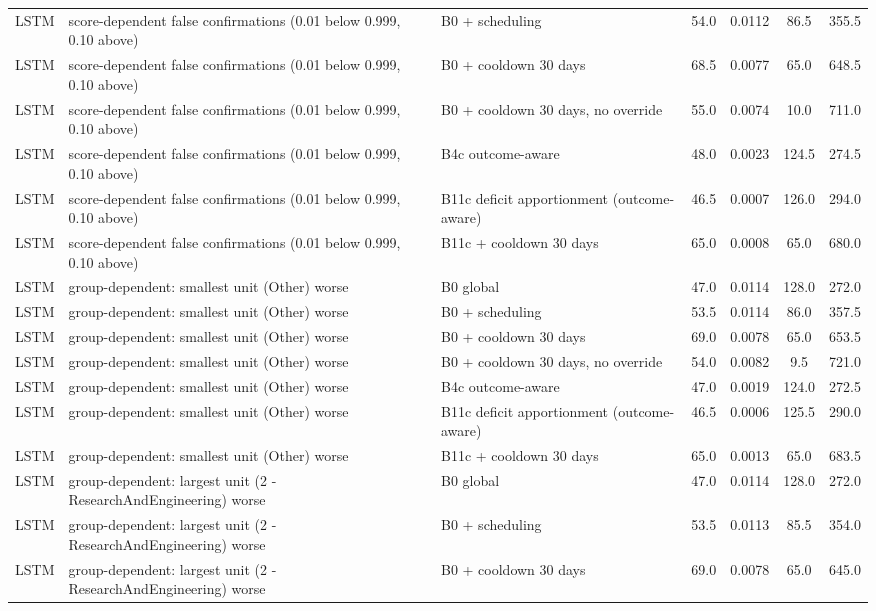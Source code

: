\begin{longtable}{lp{5.2cm}p{4.4cm}cccc}
LSTM & score-dependent false confirmations (0.01 below 0.999, 0.10 above) & B0 + scheduling & 54.0 & 0.0112 & 86.5 & 355.5 \\
LSTM & score-dependent false confirmations (0.01 below 0.999, 0.10 above) & B0 + cooldown 30 days & 68.5 & 0.0077 & 65.0 & 648.5 \\
LSTM & score-dependent false confirmations (0.01 below 0.999, 0.10 above) & B0 + cooldown 30 days, no override & 55.0 & 0.0074 & 10.0 & 711.0 \\
LSTM & score-dependent false confirmations (0.01 below 0.999, 0.10 above) & B4c outcome-aware & 48.0 & 0.0023 & 124.5 & 274.5 \\
LSTM & score-dependent false confirmations (0.01 below 0.999, 0.10 above) & B11c deficit apportionment (outcome-aware) & 46.5 & 0.0007 & 126.0 & 294.0 \\
LSTM & score-dependent false confirmations (0.01 below 0.999, 0.10 above) & B11c + cooldown 30 days & 65.0 & 0.0008 & 65.0 & 680.0 \\
LSTM & group-dependent: smallest unit (Other) worse & B0 global & 47.0 & 0.0114 & 128.0 & 272.0 \\
LSTM & group-dependent: smallest unit (Other) worse & B0 + scheduling & 53.5 & 0.0114 & 86.0 & 357.5 \\
LSTM & group-dependent: smallest unit (Other) worse & B0 + cooldown 30 days & 69.0 & 0.0078 & 65.0 & 653.5 \\
LSTM & group-dependent: smallest unit (Other) worse & B0 + cooldown 30 days, no override & 54.0 & 0.0082 & 9.5 & 721.0 \\
LSTM & group-dependent: smallest unit (Other) worse & B4c outcome-aware & 47.0 & 0.0019 & 124.0 & 272.5 \\
LSTM & group-dependent: smallest unit (Other) worse & B11c deficit apportionment (outcome-aware) & 46.5 & 0.0006 & 125.5 & 290.0 \\
LSTM & group-dependent: smallest unit (Other) worse & B11c + cooldown 30 days & 65.0 & 0.0013 & 65.0 & 683.5 \\
LSTM & group-dependent: largest unit (2 - ResearchAndEngineering) worse & B0 global & 47.0 & 0.0114 & 128.0 & 272.0 \\
LSTM & group-dependent: largest unit (2 - ResearchAndEngineering) worse & B0 + scheduling & 53.5 & 0.0113 & 85.5 & 354.0 \\
LSTM & group-dependent: largest unit (2 - ResearchAndEngineering) worse & B0 + cooldown 30 days & 69.0 & 0.0078 & 65.0 & 645.0 \\

\end{longtable}
